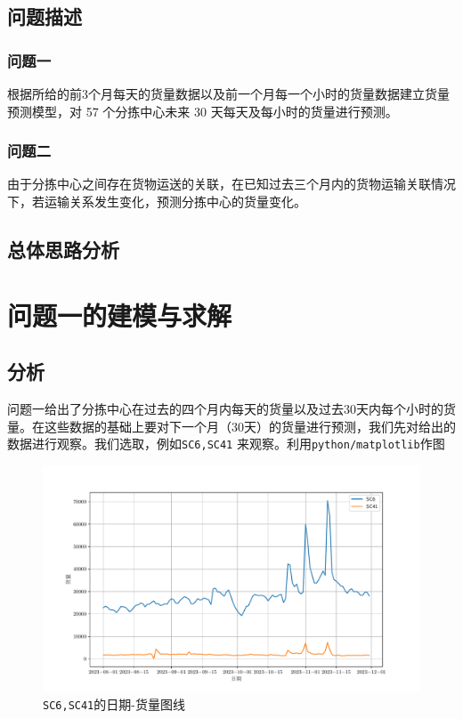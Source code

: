 \documentclass[UTF8]{article}%
\begin{document}
\subsection{问题描述}
\subsubsection{问题一}
根据所给的前3个月每天的货量数据以及前一个月每一个小时的货量数据建立货量预测模型，对 57 个分拣中心未来 30 天每天及每小时的货量进行预测。

\subsubsection{问题二}
由于分拣中心之间存在货物运送的关联，在已知过去三个月内的货物运输关联情况下，若运输关系发生变化，预测分拣中心的货量变化。
\subsection{总体思路分析}

\clearpage
\section{问题一的建模与求解}
\subsection{分析}
问题一给出了分拣中心在过去的四个月内每天的货量以及过去30天内每个小时的货量。在这些数据的基础上要对下一个月（30天）的货量进行预测，我们先对给出的数据进行观察。我们选取，例如{\tt SC6,SC41} 来观察。利用{\tt python/matplotlib}作图

\begin{figure}[!ht]
	\centering
	\includegraphics*[width=0.8\linewidth]{images/example.pdf}
	\caption{{\tt SC6,SC41}的日期-货量图线}
\end{figure}
\end{document}
